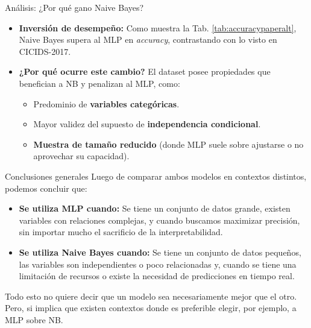 \documentclass{beamer}
\begin{document}
\begin{frame}{Análisis: ¿Por qué gano Naive Bayes?}
    \begin{itemize}
        \item \textbf{Inversión de desempeño:} Como muestra la Tab. \ref{tab:accuracypaperalt}, Naive Bayes supera al MLP en \textit{accuracy}, contrastando con lo visto en CICIDS-2017.

        \vspace{0.5cm}
        
        \item \textbf{¿Por qué ocurre este cambio?} El dataset posee propiedades que benefician a NB y penalizan al MLP, como:
        \begin{itemize}
            \item Predominio de \textbf{variables categóricas}.

            \smallskip
            
            \item Mayor validez del supuesto de \textbf{independencia condicional}.

            \smallskip
                
            \item \textbf{Muestra de tamaño reducido} (donde MLP suele sobre ajustarse o no aprovechar su capacidad).
        \end{itemize}
    \end{itemize}
\end{frame}


\begin{frame}{Conclusiones generales}
    Luego de comparar ambos modelos en contextos distintos, podemos concluir que:
    \begin{itemize}
        \item \textbf{Se utiliza MLP cuando:} Se tiene un conjunto de datos grande, existen variables con relaciones complejas, y cuando buscamos maximizar precisión, sin importar mucho el sacrificio de la interpretabilidad.
        \item \textbf{Se utiliza Naive Bayes cuando:} Se tiene un conjunto de datos pequeños, las variables son independientes o poco relacionadas y, cuando se tiene una limitación de recursos o existe la necesidad de predicciones en tiempo real.
    \end{itemize}
    
    \smallskip

    Todo esto no quiere decir que un modelo sea necesariamente mejor que el otro. Pero, si implica que existen contextos donde es preferible elegir, por ejemplo, a MLP sobre NB.
\end{frame}
\end{document}
